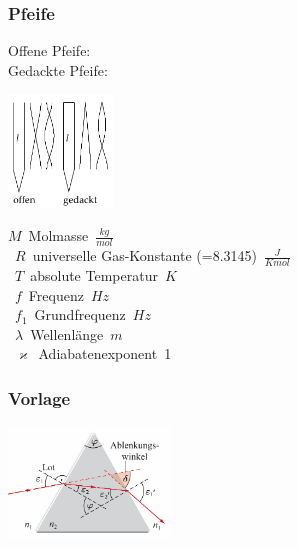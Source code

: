 \subsubsection{Pfeife}

\begin{center}
	\begin{minipage}{0.3\textwidth}
		Offene Pfeife:
		\\Gedackte Pfeife:
	\end{minipage}%
	\begin{minipage}{0.2\textwidth}
		\includegraphics[height=3cm,right,keepaspectratio=true]{Images/eigenschwingung_pfeife.png}
	\end{minipage}
\end{center}
\unit{$M$}{Molmasse}{$\frac{kg}{mol}$}\\
\unit{$R$}{universelle Gas-Konstante (=8.3145)}{$\frac{J}{K mol}$}\\
\unit{$T$}{absolute Temperatur}{$K$}\\
\unit{$f$}{Frequenz}{$Hz$}\\
\unit{$f_1$}{Grundfrequenz}{$Hz$}\\
\unit{$\lambda$}{Wellenlänge}{$m$}\\
\unit{$\varkappa$}{Adiabatenexponent}{1}\\










\subsubsection{Vorlage}

\begin{center}
	\begin{minipage}{0.3\textwidth}
		
	\end{minipage}%
	\begin{minipage}{0.3\textwidth}
		\includegraphics[height=3cm,keepaspectratio=true]{Images/prisma.png}
	\end{minipage}
\end{center}